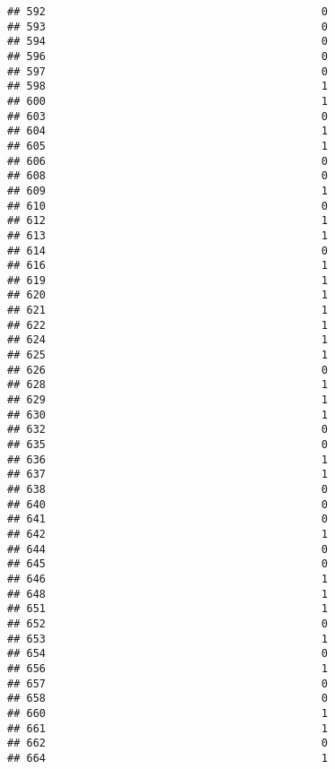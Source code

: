 \documentclass[
]{article}
\begin{document}
\begin{verbatim}
## 592                                           0
## 593                                           0
## 594                                           0
## 596                                           0
## 597                                           0
## 598                                           1
## 600                                           1
## 603                                           0
## 604                                           1
## 605                                           1
## 606                                           0
## 608                                           0
## 609                                           1
## 610                                           0
## 612                                           1
## 613                                           1
## 614                                           0
## 616                                           1
## 619                                           1
## 620                                           1
## 621                                           1
## 622                                           1
## 624                                           1
## 625                                           1
## 626                                           0
## 628                                           1
## 629                                           1
## 630                                           1
## 632                                           0
## 635                                           0
## 636                                           1
## 637                                           1
## 638                                           0
## 640                                           0
## 641                                           0
## 642                                           1
## 644                                           0
## 645                                           0
## 646                                           1
## 648                                           1
## 651                                           1
## 652                                           0
## 653                                           1
## 654                                           0
## 656                                           1
## 657                                           0
## 658                                           0
## 660                                           1
## 661                                           1
## 662                                           0
## 664                                           1

\end{verbatim}
\end{document}
